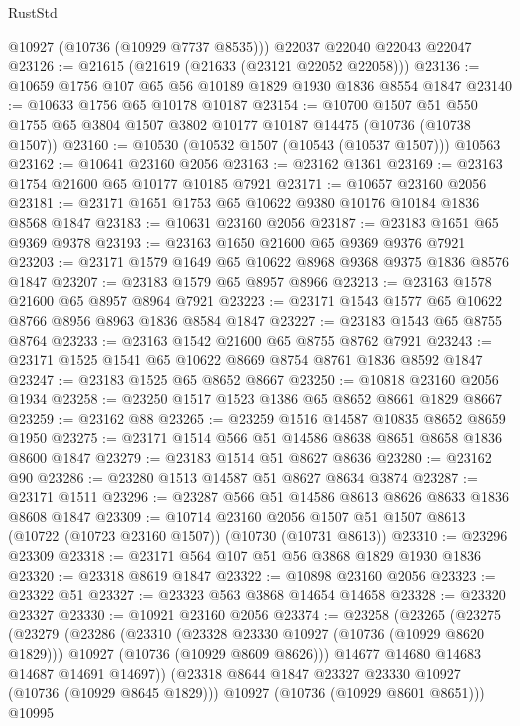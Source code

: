 \begin{lexlean}{RustStd}
\begin{coremodule}
      @10927
      (@10736 (@10929 @7737 @8535)))
    @22037
    @22040
    @22043
    @22047
@23126 := @21615 (@21619 (@21633 (@23121 @22052 @22058)))
@23136 := @10659 @1756 @107 @65 @56 @10189 @1829 @1930 @1836 @8554 @1847
@23140 := @10633 @1756 @65 @10178 @10187
@23154 := @10700
    @1507
    @51
    @550
    @1755
    @65
    @3804
    @1507
    @3802
    @10177
    @10187
    @14475
    (@10736 (@10738 @1507))
@23160 := @10530 (@10532 @1507 (@10543 (@10537 @1507))) @10563
@23162 := @10641 @23160 @2056
@23163 := @23162 @1361
@23169 := @23163 @1754 @21600 @65 @10177 @10185 @7921
@23171 := @10657 @23160 @2056
@23181 := @23171 @1651 @1753 @65 @10622 @9380 @10176 @10184 @1836 @8568 @1847
@23183 := @10631 @23160 @2056
@23187 := @23183 @1651 @65 @9369 @9378
@23193 := @23163 @1650 @21600 @65 @9369 @9376 @7921
@23203 := @23171 @1579 @1649 @65 @10622 @8968 @9368 @9375 @1836 @8576 @1847
@23207 := @23183 @1579 @65 @8957 @8966
@23213 := @23163 @1578 @21600 @65 @8957 @8964 @7921
@23223 := @23171 @1543 @1577 @65 @10622 @8766 @8956 @8963 @1836 @8584 @1847
@23227 := @23183 @1543 @65 @8755 @8764
@23233 := @23163 @1542 @21600 @65 @8755 @8762 @7921
@23243 := @23171 @1525 @1541 @65 @10622 @8669 @8754 @8761 @1836 @8592 @1847
@23247 := @23183 @1525 @65 @8652 @8667
@23250 := @10818 @23160 @2056 @1934
@23258 := @23250 @1517 @1523 @1386 @65 @8652 @8661 @1829 @8667
@23259 := @23162 @88
@23265 := @23259 @1516 @14587 @10835 @8652 @8659 @1950
@23275 := @23171 @1514 @566 @51 @14586 @8638 @8651 @8658 @1836 @8600 @1847
@23279 := @23183 @1514 @51 @8627 @8636
@23280 := @23162 @90
@23286 := @23280 @1513 @14587 @51 @8627 @8634 @3874
@23287 := @23171 @1511
@23296 := @23287 @566 @51 @14586 @8613 @8626 @8633 @1836 @8608 @1847
@23309 := @10714
    @23160
    @2056
    @1507
    @51
    @1507
    @8613
    (@10722 (@10723 @23160 @1507))
    (@10730 (@10731 @8613))
@23310 := @23296 @23309
@23318 := @23171 @564 @107 @51 @56 @3868 @1829 @1930 @1836
@23320 := @23318 @8619 @1847
@23322 := @10898 @23160 @2056
@23323 := @23322 @51
@23327 := @23323 @563 @3868 @14654 @14658
@23328 := @23320 @23327
@23330 := @10921 @23160 @2056
@23374 := @23258
    (@23265
      (@23275
        (@23279
          (@23286
            (@23310
              (@23328 @23330 @10927 (@10736 (@10929 @8620 @1829)))
              @10927
              (@10736 (@10929 @8609 @8626)))
            @14677
            @14680
            @14683
            @14687
            @14691
            @14697))
        (@23318 @8644 @1847 @23327 @23330 @10927 (@10736 (@10929 @8645 @1829)))
        @10927
        (@10736 (@10929 @8601 @8651)))
      @10995

\end{coremodule}
\end{lexlean}
